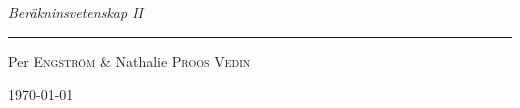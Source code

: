 \begin{center}

\vspace*{5cm}


\emph{\Large Beräkninsvetenskap II}

\rule{0.7\textwidth}{1pt}

Per \textsc{Engström} \& Nathalie \textsc{Proos Vedin}

\today

\end{center}

\thispagestyle{empty}
